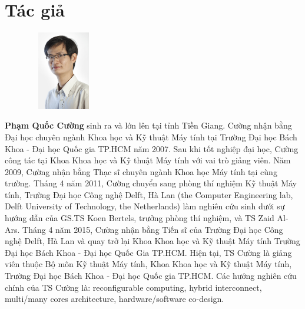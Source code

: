 \chapter*{Tác giả}

\begin{figure}
\vspace{-0.19in}
{\includegraphics[width=1.25in,height=1.35in,clip,keepaspectratio]{preface/figure/img.jpg}}
\vspace{-0.19in}
\end{figure}
\textbf{Phạm Quốc Cường} sinh ra và lớn lên tại tỉnh Tiền \mbox{Giang}. Cường nhận bằng Đại học chuyên ngành Khoa học và Kỹ thuật Máy tính tại Trường Đại học Bách Khoa - Đại học Quốc gia TP.HCM năm 2007. Sau khi tốt nghiệp đại học, Cường công tác tại Khoa Khoa học và Kỹ thuật Máy tính với vai trò giảng viên. Năm 2009, Cường nhận bằng Thạc sĩ chuyên ngành Khoa học Máy tính tại cùng trường. Tháng 4 năm 2011, Cường chuyển sang phòng thí nghiệm Kỹ thuật Máy tính, Trường Đại học Công nghệ Delft, Hà Lan (the Computer Engineering lab, Delft University of Technology, the Netherlands) làm nghiên cứu sinh dưới sự hướng dẫn của GS.TS Koen Bertels, trưởng phòng thí nghiệm, và TS Zaid Al-Ars. Tháng 4 năm 2015, Cường nhận bằng Tiến sĩ của Trường Đại học Công nghệ Delft, Hà Lan và quay trở lại Khoa Khoa học và Kỹ thuật Máy tính Trường Đại học Bách Khoa - Đại học Quốc Gia TP.HCM. Hiện tại, TS Cường là giảng viên thuộc Bộ môn Kỹ thuật Máy tính, Khoa Khoa học và Kỹ thuật Máy tính, Trường Đại học Bách Khoa - Đại học Quốc gia TP.HCM. Các hướng nghiên cứu chính của TS Cường là: reconfigurable computing, hybrid interconnect, multi/many cores architecture, hardware/software co-design.